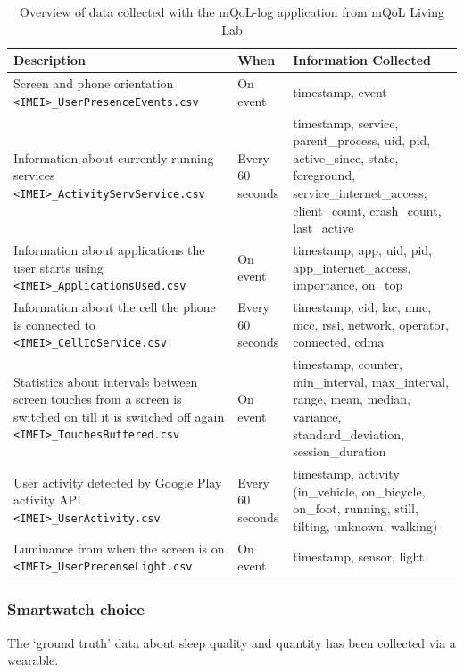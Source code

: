 \documentclass[12pt]{article} %
\begin{document}
\begin{table}[H]
\center
\begin{footnotesize}
	\begin{tabular}{| p{5.4cm} | p{1.5cm} | p{7.8cm} |}
	\hline
	\textbf{Description} & \textbf{When} & \textbf{Information Collected} \\
	\hline
	Screen and phone orientation \texttt{<IMEI>\_UserPresenceEvents.csv} & On event & timestamp, event \\
	\hline
	Information about currently running services \texttt{<IMEI>\_ActivityServService.csv} & Every 60 seconds & timestamp, service, parent\_process, uid, pid, active\_since, state, foreground, service\_internet\_access, client\_count, crash\_count, last\_active\\
	\hline
	Information about applications the user starts using \texttt{<IMEI>\_ApplicationsUsed.csv} & On event & timestamp, app, uid, pid, app\_internet\_access, importance, on\_top\\
	\hline
	Information about the cell the phone is connected to \texttt{<IMEI>\_CellIdService.csv} & Every 60 seconds & timestamp, cid, lac, mnc, mcc, rssi, network, operator, connected, cdma\\
	\hline
	Statistics about intervals between screen touches from a screen is switched on till it is switched off again \texttt{<IMEI>\_TouchesBuffered.csv} & On event & timestamp, counter, min\_interval, max\_interval, range, mean, median, variance, standard\_deviation, session\_duration \\
	\hline
	User activity detected by Google Play activity API \texttt{<IMEI>\_UserActivity.csv} & Every 60 seconds & timestamp, activity (in\_vehicle, on\_bicycle, on\_foot, running, still, tilting, unknown, walking) \\
	\hline
	Luminance from when the screen is on \texttt{<IMEI>\_UserPrecenseLight.csv} & On event & timestamp, sensor, light\\
	\hline	 
	\end{tabular}
	\caption{Overview of data collected with the mQoL-log application from mQoL Living Lab}
	\label{tab:ping}
\end{footnotesize}
\end{table}

\subsubsection{Smartwatch choice}
The `ground truth' data about sleep quality and quantity has been collected via a wearable. \\
\end{document}
